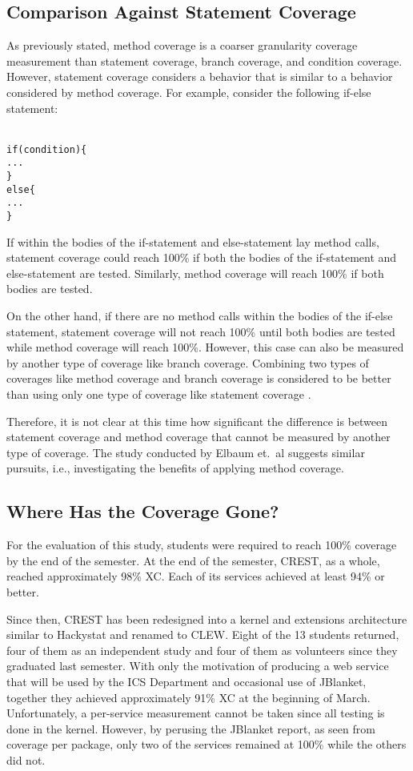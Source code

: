 \subsection{Comparison Against Statement Coverage}
As previously stated, method coverage is a coarser granularity
coverage measurement than statement coverage, branch coverage, and
condition coverage.  However, statement coverage considers a behavior that
is similar to a behavior considered by method coverage.  For example,
consider the following if-else statement:

\begin{alltt}
{\small{}
if (condition) \{
...
\}
else \{
...
\}
}
\end{alltt}
If within the bodies of the if-statement and else-statement lay method
calls, statement coverage could reach 100\% if both the bodies of the
if-statement and else-statement are tested.  Similarly, method
coverage will reach 100\% if both bodies are tested.

On the other hand, if there are no method calls within the bodies of the
if-else statement, statement coverage will not reach 100\% until both
bodies are tested while method coverage will reach 100\%.  However, this
case can also be measured by another type of coverage like branch coverage.
Combining two types of coverages like method coverage and branch coverage
is considered to be better than using only one type of coverage like
statement coverage \cite{Kaner:2002}.

Therefore, it is not clear at this time how significant the difference is
between statement coverage and method coverage that cannot be
measured by another type of coverage.  The study conducted by Elbaum et.~al
\cite{Elbaum:2002} suggests similar pursuits, i.e., investigating the
benefits of applying method coverage.

\subsection{Where Has the Coverage Gone?}
For the evaluation of this study, students were required to reach 100\%
coverage by the end of the semester.  At the end of the semester, CREST, as
a whole, reached approximately 98\% XC.  Each of its services achieved at
least 94\% or better.

Since then, CREST has been redesigned into a kernel and extensions
architecture similar to Hackystat and renamed to CLEW.  Eight of the 13
students returned, four of them as an independent study and four of them as
volunteers since they graduated last semester.  With only the motivation of
producing a web service that will be used by the ICS Department and
occasional use of JBlanket, together they achieved approximately 91\% XC at
the beginning of March.  Unfortunately, a per-service measurement cannot be
taken since all testing is done in the kernel.  However, by perusing the
JBlanket report, as seen from coverage per package, only two of the
services remained at 100\% while the others did not.

